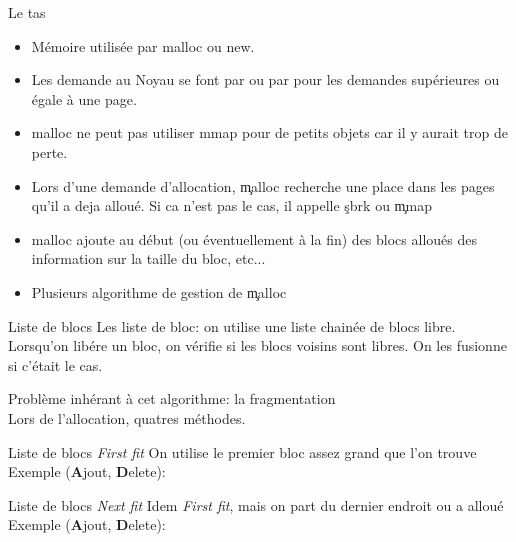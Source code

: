 \begin{frame}[fragile=singleslide]{Le tas}
  \begin{itemize}
  \item Mémoire utilisée par malloc ou new.
  \item  Les  demande  au  Noyau  se font  par    ou  par
     pour les demandes supérieures ou égale à une page.
  \item malloc ne peut pas utiliser  mmap pour de petits objets car il
    y aurait trop de perte.
  \item  Lors  d'une demande  d'allocation,  \c{malloc} recherche  une
    place dans les pages qu'il a  deja alloué. Si ca n'est pas le cas,
    il appelle \c{sbrk} ou \c{mmap}
  \item malloc ajoute au début  (ou éventuellement à la fin) des blocs
    alloués des information sur la taille du bloc, etc...
  \item Plusieurs algorithme de gestion de \c{malloc}
  \end{itemize}
\end{frame}

\begin{frame}{Liste de blocs}
  Les  liste  de   bloc:  on  utilise  une  liste   chainée  de  blocs
  libre. Lorsqu'on  libére un  bloc, on vérifie  si les  blocs voisins
  sont libres.  On les fusionne si c'était le cas.
  \begin{center}
  \end{center}
  Problème inhérant à cet algorithme: la fragmentation
  \\[2ex]
  Lors  de l'allocation, quatres méthodes.
\end{frame}

\begin{frame}{Liste de blocs}
  \emph{First fit}  On utilise  le premier bloc  assez grand  que l'on
  trouve
  \\
  Exemple (\textbf{A}jout, \textbf{D}elete):
  \begin{center}
  \end{center}
\end{frame}

\begin{frame}{Liste de blocs}
  \emph{Next  fit} Idem  \emph{First  fit}, mais  on  part du  dernier
  endroit ou a alloué
  \\
  Exemple (\textbf{A}jout, \textbf{D}elete):
  \begin{center}
  \end{center}
\end{frame}

